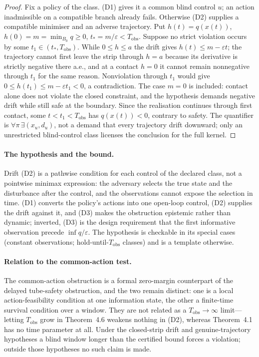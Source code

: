 \documentclass[11pt,a4paper]{article}
\theoremstyle{plain}
\theoremstyle{definition}
\theoremstyle{remark}
\newcommand{\Tobs}{T_{\mathrm{obs}}}
\newcommand{\hyp}[1]{\textup{(#1)}}
\begin{document}
\begin{proof}
Fix a policy of the class. \hyp{D1} gives it a common blind control $u$; an action inadmissible on a compatible branch already fails. Otherwise \hyp{D2} supplies a compatible minimiser and an adverse trajectory. Put $h(t)=q(x(t))$, $h(0)=m=\min_{B_0}q\ge0$, $t_*=m/\varepsilon<\Tobs$. Suppose no strict violation occurs by some $t_1\in(t_*,\Tobs)$. While $0\le h\le a$ the drift gives $h(t)\le m-\varepsilon t$; the trajectory cannot first leave the strip through $h=a$ because its derivative is strictly negative there a.e., and at a contact $h=0$ it cannot remain nonnegative through $t_1$ for the same reason. Nonviolation through $t_1$ would give $0\le h(t_1)\le m-\varepsilon t_1<0$, a contradiction. The case $m=0$ is included: contact alone does not violate the closed constraint, and the hypothesis demands negative drift while still safe at the boundary. Since the realisation continues through first contact, some $t<t_1<\Tobs$ has $q(x(t))<0$, contrary to safety. The quantifier is $\forall\pi\,\exists(x_u,d_u)$, not a demand that every trajectory drift downward; only an unrestricted blind-control class licenses the conclusion for the full kernel.
\end{proof}

\paragraph{The hypothesis and the bound.} Drift \hyp{D2} is a pathwise condition for each control of the declared class, not a pointwise minimax expression: the adversary selects the true state and the disturbance after the control, and the observations cannot expose the selection in time. \hyp{D1} converts the policy's actions into one open-loop control, \hyp{D2} supplies the drift against it, and \hyp{D3} makes the obstruction epistemic rather than dynamic; inverted, \hyp{D3} is the design requirement that the first informative observation precede $\inf q/\varepsilon$. The hypothesis is checkable in its special cases (constant observations; hold-until-$\Tobs$ classes) and is a template otherwise.

\paragraph{Relation to the common-action test.} The common-action obstruction is a formal zero-margin counterpart of the delayed tube-safety obstruction, and the two remain distinct: one is a local action-feasibility condition at one information state, the other a finite-time survival condition over a window. They are not related as a $\Tobs\to\infty$ limit---letting $\Tobs$ grow in Theorem~4.6 weakens nothing in \hyp{D2}, whereas Theorem~4.1 has no time parameter at all. Under the closed-strip drift and genuine-trajectory hypotheses a blind window longer than the certified bound forces a violation; outside those hypotheses no such claim is made.
\end{document}
